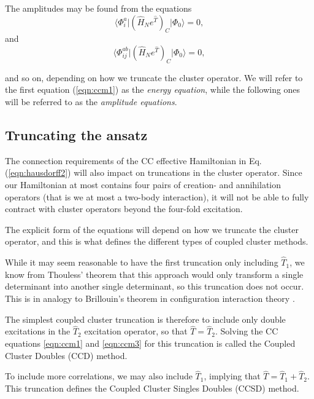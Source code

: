 The amplitudes may be found from the equations 
\begin{equation}
\langle \Phi_i^a \vert (\hat{H}_Ne^{\hat{T}})_C \vert \Phi_0 \rangle = 0  ,
\label{eqn:ccm2}
\end{equation}
and
\begin{equation}
\langle \Phi_{ij}^{ab} \vert (\hat{H}_Ne^{\hat{T}})_C \vert \Phi_0 \rangle = 0 ,
\label{eqn:ccm3}
\end{equation}

and so on, depending on how we truncate the cluster operator. We will
refer to the first equation (\ref{eqn:ccm1}) 
as the \emph{energy  equation}, while the following ones will be referred to as the
\emph{amplitude equations}.

\subsection{Truncating the ansatz}

The connection requirements of the CC effective Hamiltonian in
Eq. (\ref{eqn:hausdorff2}) will also impact on truncations in the
cluster operator. Since our Hamiltonian at most contains four pairs of
creation- and annihilation operators (that is we at most a two-body interaction), 
it will not be able to fully
contract with cluster operators beyond the four-fold excitation.

The explicit form of the equations will depend on how we truncate the
cluster operator, and this is what defines the different types of
coupled cluster methods.

While it may seem reasonable to have the first truncation only
including $\hat{T}_1$, we know from Thouless' theorem \cite[p.257]{ShavittBartlett2009}that this
approach would only transform a single determinant into another single
determinant, so this truncation does not occur. This is in analogy to
Brillouin's theorem in configuration interaction theory \cite{ShavittBartlett2009}.

The simplest coupled cluster truncation is therefore to include only
double excitations in the $\hat{T}_2$ excitation operator, so that
$\hat{T} = \hat{T}_2$. Solving the CC equations \ref{eqn:ccm1} and
\ref{eqn:ccm3} for this truncation is called the Coupled Cluster
Doubles (CCD) method.

To include more correlations, we may also include $\hat{T}_1$, implying that
$\hat{T} = \hat{T}_1 + \hat{T}_2$. This truncation defines the Coupled
Cluster Singles Doubles (CCSD) method.

